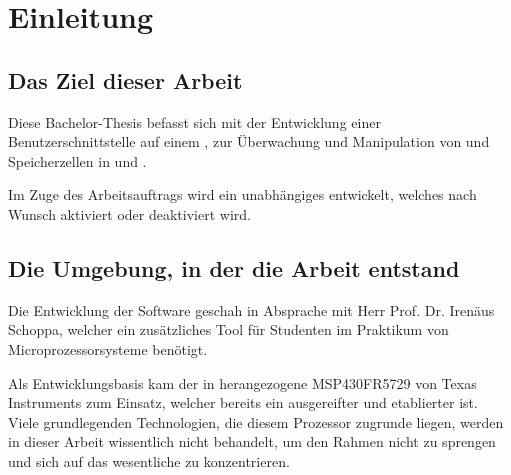 
\chapter{Einleitung}
\label{cha:Einleitung}


\section{Das Ziel dieser Arbeit}
\label{sec:ZielDerArbeit}

Diese Bachelor-Thesis befasst sich mit der Entwicklung einer  Benutzerschnittstelle auf einem , zur \"Uberwachung und Manipulation von  und Speicherzellen in  und .

Im Zuge des Arbeitsauftrags wird ein unabh\"angiges  entwickelt, welches nach Wunsch aktiviert oder deaktiviert wird.

\section{Die Umgebung, in der die Arbeit entstand}
\label{sec:EntstehungsUmgebungArbeit}

Die Entwicklung der Software geschah in Absprache mit Herr Prof. Dr. Irenäus Schoppa, welcher ein zusätzliches Tool für Studenten im Praktikum von Microprozessorsysteme benötigt.

Als Entwicklungsbasis kam der in  herangezogene MSP430FR5729 von Texas Instruments zum Einsatz, welcher bereits ein ausgereifter und etablierter  ist. Viele grundlegenden Technologien, die diesem Prozessor zugrunde liegen, werden in dieser Arbeit wissentlich nicht behandelt, um den Rahmen nicht zu sprengen und sich auf das wesentliche zu konzentrieren.


